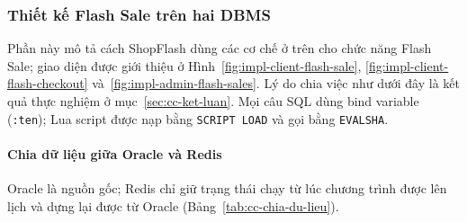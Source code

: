 
\subsubsection{Thiết kế Flash Sale trên hai DBMS}\label{sec:cc-thiet-ke}

Phần này mô tả cách ShopFlash dùng các cơ chế ở trên cho chức năng Flash Sale; giao diện được giới thiệu ở Hình~\ref{fig:impl-client-flash-sale}, \ref{fig:impl-client-flash-checkout} và~\ref{fig:impl-admin-flash-sales}. Lý do chia việc như dưới đây là kết quả thực nghiệm ở mục~\ref{sec:cc-ket-luan}. Mọi câu SQL dùng bind variable (\texttt{:ten}); Lua script được nạp bằng \texttt{SCRIPT LOAD} và gọi bằng \texttt{EVALSHA}.

\paragraph{Chia dữ liệu giữa Oracle và Redis}
Oracle là nguồn gốc; Redis chỉ giữ trạng thái chạy từ lúc chương trình được lên lịch và dựng lại được từ Oracle (Bảng~\ref{tab:cc-chia-du-lieu}).

